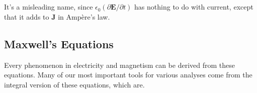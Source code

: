 \hspace{5.10cm}
\\\\ It's a misleading name, since $\epsilon_{0}(\partial \mathbf{E} / \partial t)$ has nothing to do with current, except that it adds to $\mathbf{J}$ in Ampère's law.
\subsection{Maxwell's Equations}
\begin{center}
\end{center}
Every phenomenon in electricity and magnetism can be derived from these equations. Many of our most important tools for various analyses come from the integral version of these equations, which are.
